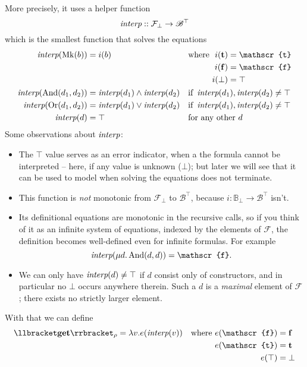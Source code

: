 \documentclass[manuscript,screen,acmsmall,nonacm]{acmart}
\newcommand{\syntax}[1]{\mathbf{#1}}
\newcommand{\sGet}{\syntax{get}}
\newcommand{\dBool}{\mathbb B}
\newcommand{\dFalse}{\mathbf{f}}
\newcommand{\dTrue}{\mathbf{t}}
\newcommand{\rBool}{\mathscr B}
\newcommand{\rTrue}{\mathscr{t}}
\newcommand{\rFalse}{\mathscr{f}}
\newcommand{\dRBool}{\mathcal F}
\newcommand{\dlambda}{\mathit{\lambda}}
\newcommand{\dMk}{\operatorname{Mk}}
\newcommand{\dAnd}{\operatorname{And}}
\newcommand{\dOr}{\operatorname{Or}}
\newcommand{\D}[1]{\llbracket #1 \rrbracket}
\begin{document}
More precisely, it uses a helper function
\[
\interp :: \dRBool_\bot \to \rBool^\top
\]
which is the smallest function that solves the equations
\begin{align*}
\interp(\dMk(b)) &= i(b) && \text{where }
\begin{aligned}[t]
i(\dTrue) &= \rTrue\\
i(\dFalse) &= \rFalse\\
i(\bot) &= \top
\end{aligned}\\
\interp(\dAnd(d_1,d_2)) &= \interp(d_1) \wedge \interp(d_2) &&\text{if } \interp(d_1),\interp(d_2) \ne \top \\
\interp(\dOr(d_1,d_2)) &= \interp(d_1) \vee \interp(d_2) &&\text{if } \interp(d_1),\interp(d_2) \ne \top \\
\interp(d) &= \top &&\text{for any other $d$}
\end{align*}
Some observations about $\operatorname{\textit{interp}}$:
\begin{itemize}
\item The $\top$ value serves as an error indicator, when a the formula cannot be interpreted -- here, if any value is unknown ($\bot$); but later we will see that it can be used to model when solving the equations does not terminate.
\item This function is \emph{not} monotonic from $\dRBool_\bot$ to $\rBool^\top$, because $i \colon \dBool_\bot \to \rBool^\top$ isn't.
\item Its definitional equations are monotonic in the recursive calls, so if you think of it as an infinite system of equations, indexed by the elements of $\dRBool$, the definition becomes well-defined even for infinite formulas. For example
\[
\interp(\mu d. \dAnd(d,d)) = \rFalse.
\]
\item We can only have $\operatorname{\textit{interp}}(d) \ne \top$ if $d$ consist only of constructors, and in particular no $\bot$ occurs anywhere therein. Such a $d$ is a \emph{maximal} element of $\dRBool$; there exists no strictly larger element.
\end{itemize}

With that we can define
\[
\D{\sGet}_\rho = \dlambda v. e(\interp(v))
\quad\text{where }
\begin{aligned}[t]
e(\rFalse) &= \dFalse\\
e(\rTrue) &= \dTrue\\
e(\top)  &= \bot
\end{aligned}
\]
\end{document}
